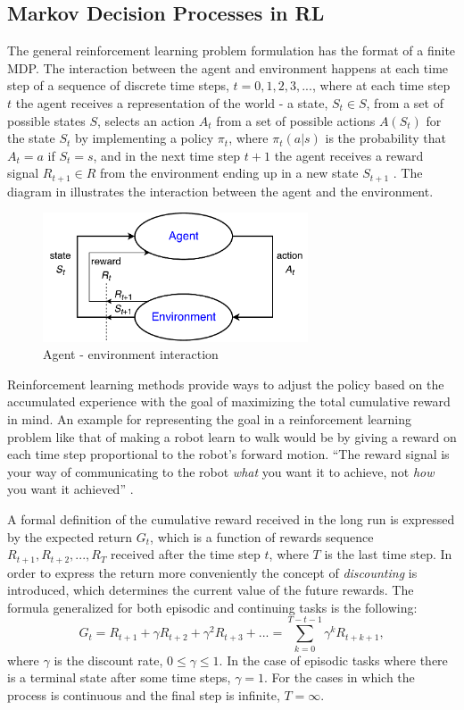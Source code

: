 \subsection{Markov Decision Processes in RL}
The general reinforcement learning problem formulation has the format of a finite MDP. The interaction between the agent and environment happens at each time step of a sequence of discrete time steps, $t=0,1,2,3,...$, where at each time step $t$ the agent receives a representation of the world - a state, $S_{t}\in S$, from a set of possible states $S$, selects an action $A_{t}$ from a set of possible actions $A(S_{t})$ for the state $S_{t}$ by implementing a policy $\pi_{t}$, where $\pi_{t}(a|s)$ is the probability that $A_{t}=a$ if $S_{t}=s$, and in the next time step $t+1$ the agent receives a reward signal $R_{t+1}\in R$ from the environment ending up in a new state $S_{t+1}$ \cite{Sutton}. The diagram in  illustrates the interaction between the agent and the environment.
\begin{figure}[H]
	\centering
	\includegraphics[width=0.7\textwidth]{Figures/Agent-EnvironmentInteraction}
	\caption{Agent - environment interaction}
	\label{fig:AgentEnv}
\end{figure}
Reinforcement learning methods provide ways to adjust the policy based on the accumulated experience with the goal of maximizing the total cumulative reward in mind. An example for representing the goal in a reinforcement learning problem like that of making a robot learn to walk would be by giving a reward on each time step proportional to the robot's forward motion. “The reward signal is your way of communicating to the robot \textit{what} you want it to achieve, not \textit{how} you want it achieved” \cite{Sutton}.

A formal definition of the cumulative reward received in the long run is expressed by the expected return $G_{t}$, which is a function of rewards sequence $R_{t+1},R_{t+2},...,R_{T}$ received after the time step $t$, where $T$ is the last time step. In order to express the return more conveniently the concept of \textit{discounting} is introduced, which determines the current value of the future rewards. The formula generalized for both episodic and continuing tasks is the following: 
\begin{equation}
G_{t}=R_{t+1}+\gamma R_{t+2}+\gamma ^2R_{t+3}+...=\sum_{k=0}^{T-t-1}\gamma ^kR_{t+k+1}, 
\end{equation}
where $\gamma$ is the discount rate, $0\leq \gamma\leq1$. In the case of episodic tasks where there is a terminal state after some time steps, $\gamma=1$. For the cases in which the process is continuous and the final step is infinite, $T=\infty$. 

